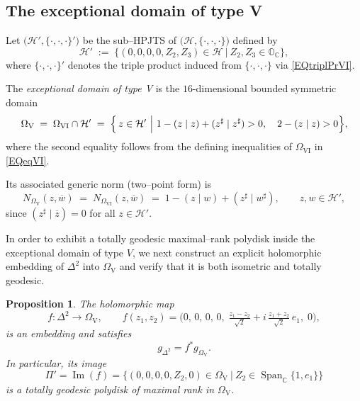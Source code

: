 \documentclass[reqno, 11pt]{amsart}
\newtheorem{prop}[theor]{Proposition}
\newcommand{\ov}[1]{\overline{#1}}
\begin{document}





\subsection{The exceptional domain of type V}
Let \(\bigl(\mathcal{H}',\{\cdot,\cdot,\cdot\}'\bigr)\) be the sub–HPJTS of \(\bigl(\mathcal{H},\{\cdot,\cdot,\cdot\}\bigr)\) defined by
\[
\mathcal{H}'
\;:=\;\bigl\{(0,0,0,0,Z_{2},Z_{3})\in\mathcal{H}\ \big|\ Z_{2},Z_{3}\in\mathbb{O}_{\mathbb{C}}\bigr\},
\]
where \(\{\cdot,\cdot,\cdot\}'\) denotes the triple product induced from \(\{\cdot,\cdot,\cdot\}\) via \eqref{EQtriplPrVI}.

The \emph{exceptional domain of type V} is the \(16\)-dimensional bounded symmetric domain
\[
\Omega_{\mathrm{V}}
\;=\;\Omega_{\mathrm{VI}}\cap\mathcal{H}'
\;=\;
\Bigl\{\,z\in\mathcal{H}'\ \Big|\ 
1-(z\mid  z)+(z^{\sharp}\mid {z^{\sharp}})>0,\quad
2-(z\mid z)>0
\Bigr\},
\]
where the second equality follows from the defining inequalities of \(\Omega_{\mathrm{VI}}\) in \eqref{EQeqVI}.

Its associated generic norm (two–point form) is
\begin{equation}\label{EQgennormV}
N_{\Omega_{\mathrm{V}}}(z,\ov w)
\;=\;
N_{\Omega_{\mathrm{VI}}}(z,\ov w)
\;=\;
1-(z\mid w)+(z^{\sharp}\mid w^{\sharp}),
\qquad z,w\in \mathcal{H}',
\end{equation}
since \((z^{\sharp}\mid\ov z)=0\) for all \(z\in\mathcal{H}'\).

In order to exhibit a totally geodesic maximal–rank polydisk inside the exceptional domain of type \(V\), we next construct an explicit holomorphic embedding of \(\Delta^2\) into \(\Omega_{\mathrm{V}}\) and verify that it is both isometric and totally geodesic.






\begin{prop}\label{PROPpolymaxV}
The holomorphic map
\[
f \colon \Delta^2 \longrightarrow \Omega_{\mathrm{V}},\qquad
f(z_{1},z_{2})
=\bigl(0,\,0,\,0,\,0,\;\tfrac{z_{1}-z_{2}}{\sqrt{2}}+ i\,\tfrac{z_{1}+z_{2}}{\sqrt{2}}\,e_{1},\;0\bigr),
\]
is an embedding and satisfies
\[
g_{\Delta^2}=f^{*}g_{\Omega_{\mathrm{V}}}.
\]
In particular, its image
\[
\Pi'=\operatorname{Im}(f)
=\bigl\{(0,0,0,0,Z_{2},0)\in\Omega_{\mathrm{V}}\ \big|\ Z_{2}\in\operatorname {Span}_{\mathbb C}\{1,e_{1}\}\bigr\}
\]
is a totally geodesic polydisk of maximal rank in \(\Omega_{\mathrm{V}}\).
\end{prop}
\end{document}
